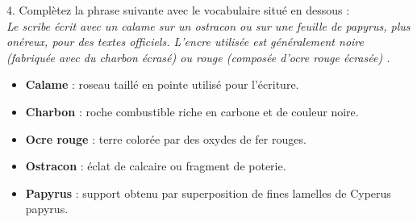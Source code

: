 \documentclass[12pt,a4paper]{article}
\begin{document}
   4. Complètez la phrase suivante avec le vocabulaire situé en dessous : \\ [2mm]
   {\it \og Le scribe écrit avec un {\red calame} sur un {\red ostracon} ou sur une feuille de {\red papyrus}, plus onéreux, pour des textes officiels. L'encre utilisée est généralement noire (fabriquée avec du {\red charbon } écrasé) ou rouge (composée d'{\red ocre rouge} écrasée) \fg.} \\ [-3mm]
   {\small
   \begin{itemize}
      \item {\bf Calame} : roseau taillé en pointe utilisé pour l'écriture.
      \item {\bf Charbon} : roche combustible riche en carbone et de couleur noire.
      \item {\bf Ocre rouge} : terre colorée par des oxydes de fer rouges.
      \item {\bf Ostracon} : éclat de calcaire ou fragment de poterie.
      \item {\bf Papyrus} : support obtenu par superposition de fines lamelles de Cyperus papyrus.
   \end{itemize}}

\pagebreak
\thispagestyle{empty}
   
\end{document}
